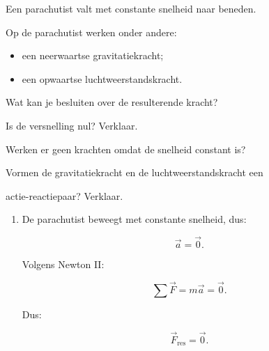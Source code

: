 \documentclass{ximera}
\begin{document}
\begin{oefening}[De parachutist]{\oefU\ESS}

Een parachutist valt met constante snelheid naar beneden.

Op de parachutist werken onder andere:

\begin{itemize}

 \item een neerwaartse gravitatiekracht;

 \item een opwaartse luchtweerstandskracht.

\end{itemize}

\begin{question}

Wat kan je besluiten over de resulterende kracht?

\end{question}

\begin{question}

Is de versnelling nul? Verklaar.

\end{question}

\begin{question}

Werken er geen krachten omdat de snelheid constant is?

\end{question}

\begin{question}

Vormen de gravitatiekracht en de luchtweerstandskracht een

actie-reactiepaar? Verklaar.

\end{question}


\begin{oplossing}

\begin{enumerate}

  \item De parachutist beweegt met constante snelheid, dus:

  \[\vec a=\vec0.\]

  Volgens Newton II:

  \[\sum\vec F=m\vec a=\vec0.\]

  Dus:

  \[\boxed{\vec F_{\mathrm{res}}=\vec0}.\]


\end{enumerate}
\end{oplossing}
\end{oefening}
\end{document}
